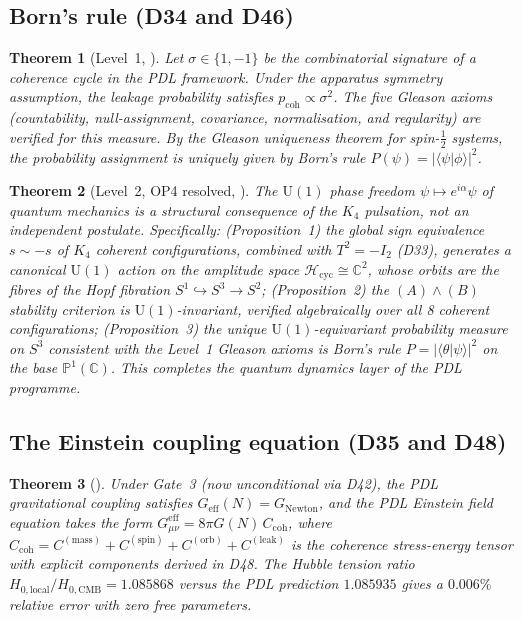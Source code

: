 \documentclass[11pt,a4paper]{article}
\theoremstyle{plain}
\newtheorem{theorem}{Theorem}[section]
\theoremstyle{definition}
\theoremstyle{remark}
\newcommand{\Ccoh}{C_{\mathrm{coh}}}
\begin{document}
\subsection{Born's rule (D34 and D46)}
\label{subsec:born}
\begin{theorem}[Level~1, \cite{D34}]
\label{thm:BornL1}
Let $\sigma\in\{1,-1\}$ be the combinatorial signature of a coherence cycle in the PDL framework. Under the apparatus symmetry assumption, the leakage probability satisfies $p_{\mathrm{coh}}\propto\sigma^2$. The five Gleason axioms (countability, null-assignment, covariance, normalisation, and regularity) are verified for this measure. By the Gleason uniqueness theorem for spin-$\tfrac{1}{2}$ systems, the probability assignment is uniquely given by Born's rule $P(\psi)=|\langle\psi|\phi\rangle|^2$.
\end{theorem}

\begin{theorem}[Level~2, OP4 resolved, \cite{D46}]
\label{thm:BornL2}
The $\mathrm{U}(1)$ phase freedom $\psi \mapsto e^{i\alpha}\psi$ of quantum mechanics is a structural consequence of the $K_4$ pulsation, not an independent postulate. Specifically: (Proposition~1) the global sign equivalence $s \sim -s$ of $K_4$ coherent configurations, combined with $T^2=-I_2$ (D33), generates a canonical $\mathrm{U}(1)$ action on the amplitude space $\mathcal{H}_{\mathrm{cyc}} \cong \mathbb{C}^2$, whose orbits are the fibres of the Hopf fibration $S^1\hookrightarrow S^3\to S^2$; (Proposition~2) the $(A)\wedge(B)$ stability criterion is $\mathrm{U}(1)$-invariant, verified algebraically over all 8 coherent configurations; (Proposition~3) the unique $\mathrm{U}(1)$-equivariant probability measure on $S^3$ consistent with the Level~1 Gleason axioms is Born's rule $P=|\langle\theta|\psi\rangle|^2$ on the base $\mathbb{P}^1(\mathbb{C})$. This completes the quantum dynamics layer of the PDL programme.
\end{theorem}

\subsection{The Einstein coupling equation (D35 and D48)}
\label{subsec:einstein}
\begin{theorem}[\cite{D35,D48}]
\label{thm:Einstein}
Under Gate~3 (now unconditional via D42), the PDL gravitational coupling satisfies $G_{\mathrm{eff}}(N)=G_{\mathrm{Newton}}$, and the PDL Einstein field equation takes the form $G_{\mu\nu}^{\mathrm{eff}}=8\pi G(N)\,\Ccoh$, where $\Ccoh = C^{(\mathrm{mass})} + C^{(\mathrm{spin})} + C^{(\mathrm{orb})} + C^{(\mathrm{leak})}$ is the coherence stress-energy tensor with explicit components derived in D48. The Hubble tension ratio $H_{0,\mathrm{local}}/H_{0,\mathrm{CMB}}=1.085868$ versus the PDL prediction $1.085935$ gives a $0.006\%$ relative error with zero free parameters.
\end{theorem}
\end{document}
